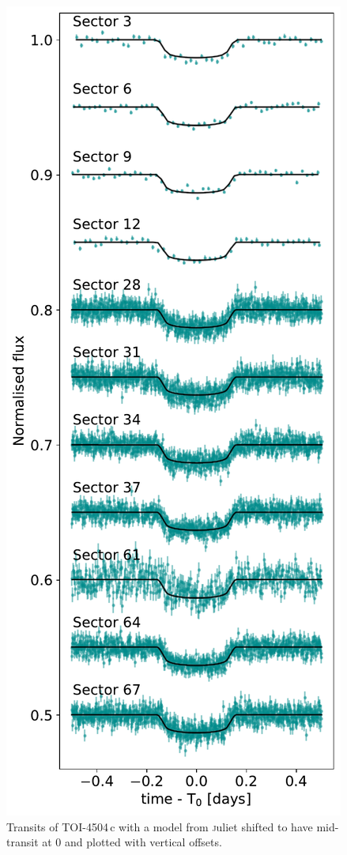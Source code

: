 \documentclass[twocolumn,twocolappendix]{aastex631}
\begin{document}
\begin{figure}
\centering
\includegraphics[width=1\linewidth]{transits.pdf}
\caption{Transits of TOI-4504\,c with a model from {\textsc juliet} shifted to have mid-transit at 0 and plotted with vertical offsets.}
\label{trans} 
\end{figure}
\end{document}
